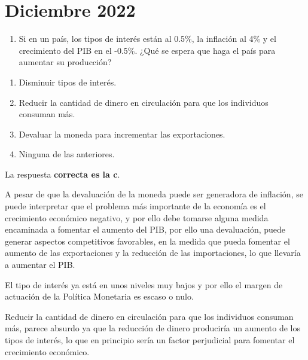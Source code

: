 \documentclass[
  letterpaper,
  DIV=11,
  numbers=noendperiod]{scrreprt}
\providecommand{\tightlist}{%
  \setlength{\itemsep}{0pt}\setlength{\parskip}{0pt}}\usepackage{longtable,booktabs,array}
\begin{document}
\hypertarget{diciembre-2022}{%
\chapter*{Diciembre 2022}\label{diciembre-2022}}


\begin{enumerate}
\def\labelenumi{\arabic{enumi}.}
\tightlist
\item
  Si en un país, los tipos de interés están al 0.5\%, la inflación al
  4\% y el crecimiento del PIB en el -0.5\%. ¿Qué se espera que haga el
  país para aumentar su producción?
\end{enumerate}

\begin{enumerate}
\def\labelenumi{\alph{enumi})}
\item
  Disminuir tipos de interés.
\item
  Reducir la cantidad de dinero en circulación para que los individuos
  consuman más.
\item
  Devaluar la moneda para incrementar las exportaciones.
\item
  Ninguna de las anteriores.
\end{enumerate}

\begin{tcolorbox}[enhanced jigsaw, left=2mm, breakable, arc=.35mm, opacityback=0, toprule=.15mm, rightrule=.15mm, leftrule=.75mm, bottomrule=.15mm, colframe=quarto-callout-tip-color-frame, colback=white]
\begin{minipage}[t]{5.5mm}
\textcolor{quarto-callout-tip-color}{\faLightbulb}
\end{minipage}%
\begin{minipage}[t]{\textwidth - 5.5mm}

La respuesta \textbf{correcta es la c}.

A pesar de que la devaluación de la moneda puede ser generadora de
inflación, se puede interpretar que el problema más importante de la
economía es el crecimiento económico negativo, y por ello debe tomarse
alguna medida encaminada a fomentar el aumento del PIB, por ello una
devaluación, puede generar aspectos competitivos favorables, en la
medida que pueda fomentar el aumento de las exportaciones y la reducción
de las importaciones, lo que llevaría a aumentar el PIB.

El tipo de interés ya está en unos niveles muy bajos y por ello el
margen de actuación de la Política Monetaria es escaso o nulo.

Reducir la cantidad de dinero en circulación para que los individuos
consuman más, parece absurdo ya que la reducción de dinero produciría un
aumento de los tipos de interés, lo que en principio sería un factor
perjudicial para fomentar el crecimiento económico.

\end{minipage}%
\end{tcolorbox}
\end{document}
